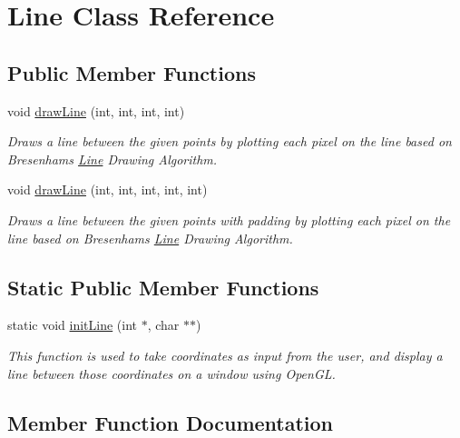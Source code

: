 \hypertarget{class_line}{}\section{Line Class Reference}
\label{class_line}
\subsection*{Public Member Functions}
\begin{DoxyCompactItemize}
\item 
void \mbox{\hyperlink{class_line_abba386ec98cac3158d04915a62185b19}{draw\+Line}} (int, int, int, int)
\begin{DoxyCompactList}\small\item\em Draws a line between the given points by plotting each pixel on the line based on Bresenham\textquotesingle{}s \mbox{\hyperlink{class_line}{Line}} Drawing Algorithm. \end{DoxyCompactList}\item 
void \mbox{\hyperlink{class_line_a4e7daa2b6095dc0a1afe6bf4a1e55033}{draw\+Line}} (int, int, int, int, int)
\begin{DoxyCompactList}\small\item\em Draws a line between the given points with padding by plotting each pixel on the line based on Bresenham\textquotesingle{}s \mbox{\hyperlink{class_line}{Line}} Drawing Algorithm. \end{DoxyCompactList}\end{DoxyCompactItemize}
\subsection*{Static Public Member Functions}
\begin{DoxyCompactItemize}
\item 
static void \mbox{\hyperlink{class_line_a4bbe9757d2b364c146dca483bd52023b}{init\+Line}} (int $\ast$, char $\ast$$\ast$)
\begin{DoxyCompactList}\small\item\em This function is used to take coordinates as input from the user, and display a line between those coordinates on a window using Open\+GL. \end{DoxyCompactList}\end{DoxyCompactItemize}


\subsection{Member Function Documentation}
\mbox{\label{class_line_abba386ec98cac3158d04915a62185b19}} 
